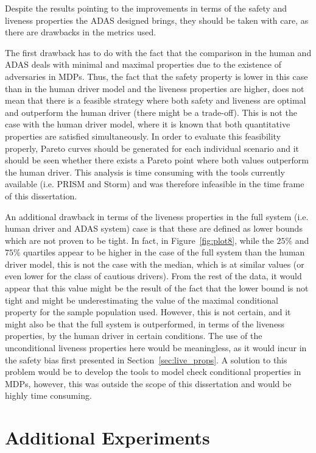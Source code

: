 Despite the results pointing to the improvements in terms of the safety and liveness properties the ADAS designed brings, they should be taken with care, as there are drawbacks in the metrics used. 

The first drawback has to do with the fact that the comparison in the human and ADAS deals with minimal and maximal properties due to the existence of adversaries in MDPs. Thus, the fact that the safety property is lower in this case than in the human driver model and the liveness properties are higher, does not mean that there is a feasible strategy where both safety and liveness are optimal and outperform the human driver (there might be a trade-off). This is not the case with the human driver model, where it is known that both quantitative properties are satisfied simultaneously. In order to evaluate this feasibility properly, Pareto curves should be generated for each individual scenario and it should be seen whether there exists a Pareto point where both values outperform the human driver. This analysis is time consuming with the tools currently available (i.e. PRISM and Storm) and was therefore infeasible in the time frame of this dissertation. 

An additional drawback in terms of the liveness properties in the full system (i.e. human driver and ADAS system) case is that these are defined as lower bounds which are not proven to be tight. In fact, in Figure~\ref{fig:plot8}, while the $25\%$ and $75\%$ quartiles appear to be higher in the case of the full system than the human driver model, this is not the case with the median, which is at similar values (or even lower for the class of cautious drivers). From the rest of the data, it would appear that this value might be the result of the fact that the lower bound is not tight and might be underestimating the value of the maximal conditional property for the sample population used. However, this is not certain, and it might also be that the full system is outperformed, in terms of the liveness properties, by the human driver in certain conditions. The use of the unconditional liveness properties here would be meaningless, as it would incur in the safety bias first presented in Section~\ref{sec:live_props}. A solution to this problem would be to develop the tools to model check conditional properties in MDPs, however, this was outside the scope of this dissertation and would be highly time consuming.

\section{Additional Experiments}

